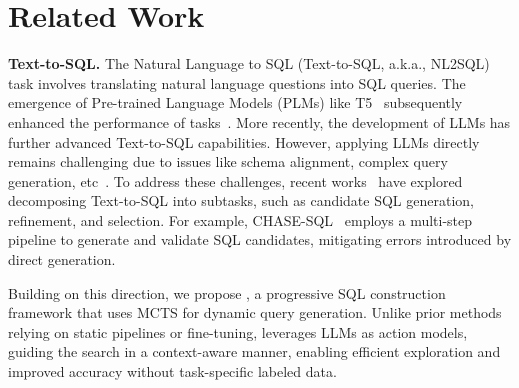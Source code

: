 \section{Related Work}
\label{sec:related}




\textbf{Text-to-SQL.}
The Natural Language to SQL (Text-to-SQL, a.k.a., NL2SQL) task involves translating natural language questions into SQL queries. 
The emergence of Pre-trained Language Models (PLMs) like T5~\cite{t5} subsequently enhanced the performance of \nlsql tasks~\cite{PICARD, RESD-SQL, Graphix-SQL}. 
More recently, the development of LLMs has further advanced Text-to-SQL capabilities. 
However, applying LLMs directly remains challenging due to issues like schema alignment, complex query generation, etc~\cite{nl2sql-survey}.
To address these challenges, recent works~\cite{CHASE, chesssql, supersql, rslsql} have explored decomposing Text-to-SQL into subtasks, such as candidate SQL generation, refinement, and selection. For example, CHASE-SQL~\cite{CHASE} employs a multi-step pipeline to generate and validate SQL candidates, mitigating errors introduced by direct generation.

Building on this direction, we propose \sys, a progressive SQL construction framework that uses MCTS for dynamic query generation. Unlike prior methods relying on static pipelines or fine-tuning, \sys leverages LLMs as action models, guiding the search in a context-aware manner, enabling efficient exploration and improved accuracy without task-specific labeled data.
% 

